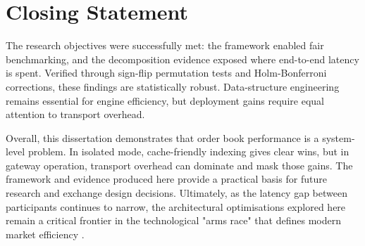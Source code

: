 \section{Closing Statement}
The research objectives were successfully met: the framework enabled 
fair benchmarking, and the decomposition evidence exposed where 
end-to-end latency is spent. Verified through sign-flip permutation 
tests and Holm-Bonferroni corrections, these findings are 
statistically robust. Data-structure engineering remains 
essential for engine efficiency, but deployment gains require 
equal attention to transport overhead.

Overall, this dissertation demonstrates that order book performance is a 
system-level problem. In isolated mode, cache-friendly indexing gives clear 
wins, but in gateway operation, transport overhead can dominate and mask those 
gains. The framework and evidence produced here provide a practical basis for 
future research and exchange design decisions. Ultimately, as the latency 
gap between participants continues to narrow, the architectural 
optimisations explored here remain a critical frontier in the 
technological "arms race" that defines modern market efficiency 
\citep{aquilina2022armsrace}.
